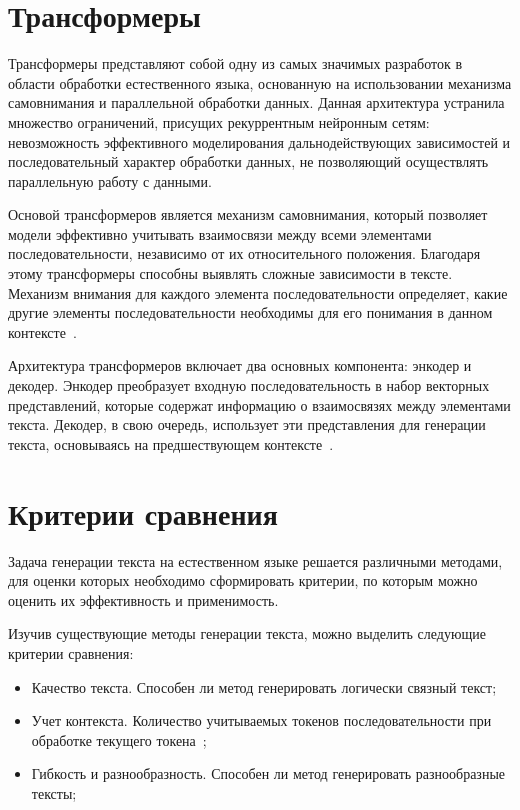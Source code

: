 \section{Трансформеры}
Трансформеры представляют собой одну из самых значимых разработок в области обработки естественного языка, основанную на использовании механизма самовнимания и параллельной обработки данных. Данная архитектура устранила множество ограничений, присущих рекуррентным нейронным сетям: невозможность эффективного моделирования дальнодействующих зависимостей и последовательный характер обработки данных, не позволяющий осуществлять параллельную работу с данными.

Основой трансформеров является механизм самовнимания, который позволяет модели эффективно учитывать взаимосвязи между всеми элементами последовательности, независимо от их относительного положения. Благодаря этому трансформеры способны выявлять сложные зависимости в тексте. Механизм внимания для каждого элемента последовательности определяет, какие другие элементы последовательности необходимы для его понимания в данном контексте~\cite{Трансформеры_1}. 

Архитектура трансформеров включает два основных компонента: энкодер и декодер. Энкодер преобразует входную последовательность в набор векторных представлений, которые содержат информацию о взаимосвязях между элементами текста. Декодер, в свою очередь, использует эти представления для генерации текста, основываясь на предшествующем контексте~\cite{Трансформеры_2}.

\section{Критерии сравнения}
Задача генерации текста на естественном языке решается различными методами, для оценки которых необходимо сформировать критерии, по которым можно оценить их эффективность и применимость. 

Изучив существующие методы генерации текста, можно выделить следующие критерии сравнения:
\begin{itemize}
    \item[---] Качество текста. Способен ли метод генерировать логически связный текст;
    \item[---] Учет контекста. Количество учитываемых токенов последовательности при обработке текущего токена~\cite{Сравенение};
    \item[---] Гибкость и разнообразность. Способен ли метод генерировать разнообразные тексты;
\end{itemize}

